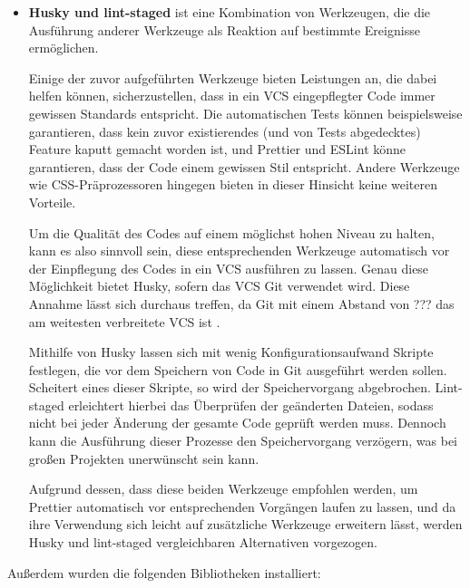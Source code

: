 \begin{itemize}
\item \textbf{Husky und lint-staged} ist eine Kombination von Werkzeugen, die die Ausführung anderer Werkzeuge als Reaktion auf bestimmte Ereignisse ermöglichen.

Einige der zuvor aufgeführten Werkzeuge bieten Leistungen an, die dabei helfen können, sicherzustellen, dass in ein \gls{VCS} eingepflegter Code immer gewissen Standards entspricht. Die automatischen Tests können beispielsweise garantieren, dass kein zuvor existierendes (und von Tests abgedecktes) Feature kaputt gemacht worden ist, und Prettier und ESLint könne garantieren, dass der Code einem gewissen Stil entspricht. Andere Werkzeuge wie CSS-Präprozessoren hingegen bieten in dieser Hinsicht keine weiteren Vorteile.

Um die Qualität des Codes auf einem möglichst hohen Niveau zu halten, kann es also sinnvoll sein, diese entsprechenden Werkzeuge automatisch vor der Einpflegung des Codes in ein \gls{VCS} ausführen zu lassen. Genau diese Möglichkeit bietet Husky, sofern das \gls{VCS} Git verwendet wird. Diese Annahme lässt sich durchaus treffen, da Git mit einem Abstand von ??? das am weitesten verbreitete \gls{VCS} ist \missingQuote.

Mithilfe von Husky lassen sich mit wenig Konfigurationsaufwand Skripte festlegen, die vor dem Speichern von Code in Git ausgeführt werden sollen. Scheitert eines dieser Skripte, so wird der Speichervorgang abgebrochen. Lint-staged erleichtert hierbei das Überprüfen der geänderten Dateien, sodass nicht bei jeder Änderung der gesamte Code geprüft werden muss. Dennoch kann die Ausführung dieser Prozesse den Speichervorgang verzögern, was bei großen Projekten unerwünscht sein kann.

Aufgrund dessen, dass diese beiden Werkzeuge empfohlen werden, um Prettier automatisch vor entsprechenden Vorgängen laufen zu lassen, und da ihre Verwendung sich leicht auf zusätzliche Werkzeuge erweitern lässt, werden Husky und lint-staged vergleichbaren Alternativen vorgezogen.
\end{itemize}

Außerdem wurden die folgenden Bibliotheken installiert:

